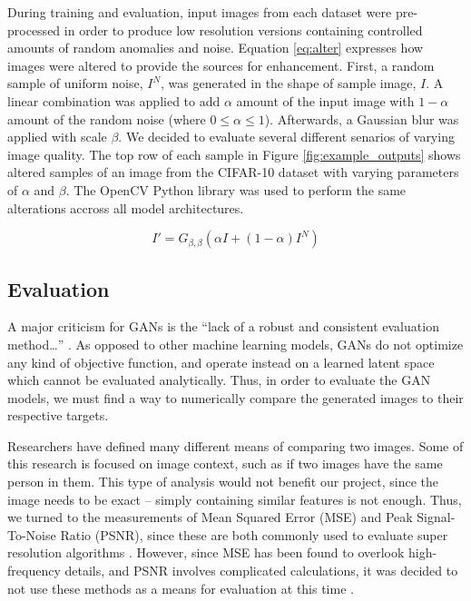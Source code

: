 \documentclass[letterpaper]{article} %
\begin{document}
During training and evaluation, input images from each dataset were pre-processed
in order to produce low resolution versions containing controlled amounts of random anomalies and noise.
Equation \ref{eq:alter} expresses how images were altered to provide the sources for enhancement.
First, a random sample of uniform noise, $I^{N}$, was generated in the shape of
sample image, $I$. A linear combination was applied to add $\alpha$ amount of the input
image with $1 - \alpha$ amount of the random noise
(where $0 \leq \alpha \leq 1$).
Afterwards, a Gaussian blur was applied with scale $\beta$.
We decided to evaluate several different senarios of varying image quality.
The top row of each sample in Figure \ref{fig:example_outputs} shows altered samples
of an image from the CIFAR-10 dataset with varying parameters of $\alpha$ and $\beta$.
The OpenCV Python library was used to perform the same alterations accross all model architectures.

\begin{equation}
\label{eq:alter}
I' = G_{\beta,\beta}(\alpha I + (1 - \alpha)I^{N})
\end{equation}

\subsection{Evaluation}
A major criticism for GANs is the
``lack of a robust and consistent evaluation method\dots''
\cite{gmm}.
As opposed to other machine learning models, GANs do not optimize any kind of objective function,
and operate instead on a learned latent space
which cannot be evaluated analytically.
Thus, in order to evaluate the GAN models,
we must find a way to numerically compare the generated images to their respective targets.

Researchers have defined many different means of comparing two images.
Some of this research is focused on image context, such as if two images have the same
person in them.
This type of analysis would not benefit our project,
since the image needs to be exact --
simply containing similar features is not enough.
Thus, we turned to the measurements of
Mean Squared Error (MSE) and Peak Signal-To-Noise Ratio (PSNR),
since these are both commonly used to evaluate super resolution algorithms
\cite{super_resolution}.
However, since MSE has been found to overlook high-frequency details,
and PSNR involves complicated calculations,
it was decided to not use these methods as a means for evaluation
at this time
\cite{srgan}.
\end{document}
